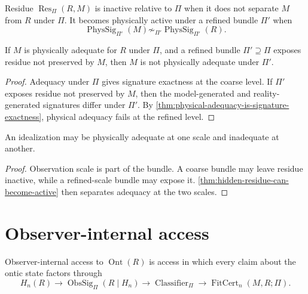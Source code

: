 \begin{definition}
\label{def:physically-active-residue}
Residue $\operatorname{Res}_{\Pi}(R,M)$ is inactive relative to $\Pi$ when it does not separate $M$ from $R$ under $\Pi$. It becomes physically active under a refined bundle $\Pi'$ when
$$
\operatorname{PhysSig}_{\Pi'}(M)
\not\sim_{\Pi'}
\operatorname{PhysSig}_{\Pi'}(R).
$$
\end{definition}

\begin{theorem}
\label{thm:hidden-residue-can-become-active}
If $M$ is physically adequate for $R$ under $\Pi$, and a refined bundle $\Pi'\supseteq\Pi$ exposes residue not preserved by $M$, then $M$ is not physically adequate under $\Pi'$.
\end{theorem}

\begin{proof}
Adequacy under $\Pi$ gives signature exactness at the coarse level. If $\Pi'$ exposes residue not preserved by $M$, then the model-generated and reality-generated signatures differ under $\Pi'$. By \autoref{thm:physical-adequacy-is-signature-exactness}, physical adequacy fails at the refined level.
\end{proof}

\begin{corollary}
\label{cor:idealization-scale-relative}
An idealization may be physically adequate at one scale and inadequate at another.
\end{corollary}

\begin{proof}
Observation scale is part of the bundle. A coarse bundle may leave residue inactive, while a refined-scale bundle may expose it. \autoref{thm:hidden-residue-can-become-active} then separates adequacy at the two scales.
\end{proof}

\section{Observer-internal access}
\label{sec:observer-internal-ontic-access}

\begin{definition}
\label{def:observer-internal-ontic-access}
Observer-internal access to $\operatorname{Ont}(R)$ is access in which every claim about the ontic state factors through
$$
H_n(R)
\longrightarrow
\operatorname{ObsSig}_{\Pi}(R\mid H_n)
\longrightarrow
\operatorname{Classifier}_{\Pi}
\longrightarrow
\operatorname{FitCert}_n(M,R;\Pi).
$$
\end{definition}

